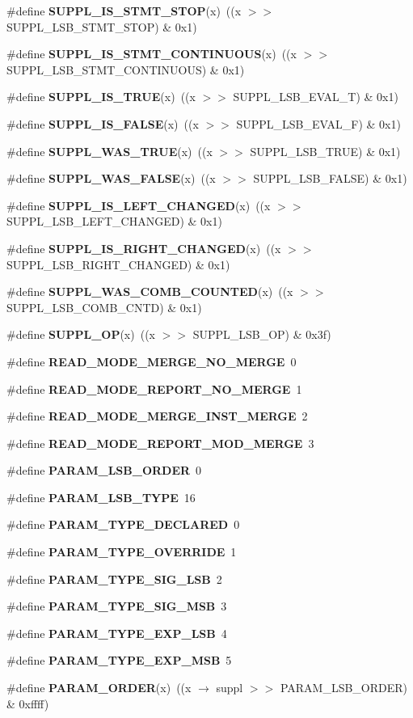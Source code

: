 \begin{CompactItemize}
\item 
\#define {\bf SUPPL\_\-IS\_\-STMT\_\-STOP}(x)\ ((x $>$$>$ SUPPL\_\-LSB\_\-STMT\_\-STOP) \& 0x1)
\item 
\#define {\bf SUPPL\_\-IS\_\-STMT\_\-CONTINUOUS}(x)\ ((x $>$$>$ SUPPL\_\-LSB\_\-STMT\_\-CONTINUOUS) \& 0x1)
\item 
\#define {\bf SUPPL\_\-IS\_\-TRUE}(x)\ ((x $>$$>$ SUPPL\_\-LSB\_\-EVAL\_\-T) \& 0x1)
\item 
\#define {\bf SUPPL\_\-IS\_\-FALSE}(x)\ ((x $>$$>$ SUPPL\_\-LSB\_\-EVAL\_\-F) \& 0x1)
\item 
\#define {\bf SUPPL\_\-WAS\_\-TRUE}(x)\ ((x $>$$>$ SUPPL\_\-LSB\_\-TRUE) \& 0x1)
\item 
\#define {\bf SUPPL\_\-WAS\_\-FALSE}(x)\ ((x $>$$>$ SUPPL\_\-LSB\_\-FALSE) \& 0x1)
\item 
\#define {\bf SUPPL\_\-IS\_\-LEFT\_\-CHANGED}(x)\ ((x $>$$>$ SUPPL\_\-LSB\_\-LEFT\_\-CHANGED) \& 0x1)
\item 
\#define {\bf SUPPL\_\-IS\_\-RIGHT\_\-CHANGED}(x)\ ((x $>$$>$ SUPPL\_\-LSB\_\-RIGHT\_\-CHANGED) \& 0x1)
\item 
\#define {\bf SUPPL\_\-WAS\_\-COMB\_\-COUNTED}(x)\ ((x $>$$>$ SUPPL\_\-LSB\_\-COMB\_\-CNTD) \& 0x1)
\item 
\#define {\bf SUPPL\_\-OP}(x)\ ((x $>$$>$ SUPPL\_\-LSB\_\-OP) \& 0x3f)
\item 
\#define {\bf READ\_\-MODE\_\-MERGE\_\-NO\_\-MERGE}\ 0
\item 
\#define {\bf READ\_\-MODE\_\-REPORT\_\-NO\_\-MERGE}\ 1
\item 
\#define {\bf READ\_\-MODE\_\-MERGE\_\-INST\_\-MERGE}\ 2
\item 
\#define {\bf READ\_\-MODE\_\-REPORT\_\-MOD\_\-MERGE}\ 3
\item 
\#define {\bf PARAM\_\-LSB\_\-ORDER}\ 0
\item 
\#define {\bf PARAM\_\-LSB\_\-TYPE}\ 16
\item 
\#define {\bf PARAM\_\-TYPE\_\-DECLARED}\ 0
\item 
\#define {\bf PARAM\_\-TYPE\_\-OVERRIDE}\ 1
\item 
\#define {\bf PARAM\_\-TYPE\_\-SIG\_\-LSB}\ 2
\item 
\#define {\bf PARAM\_\-TYPE\_\-SIG\_\-MSB}\ 3
\item 
\#define {\bf PARAM\_\-TYPE\_\-EXP\_\-LSB}\ 4
\item 
\#define {\bf PARAM\_\-TYPE\_\-EXP\_\-MSB}\ 5
\item 
\#define {\bf PARAM\_\-ORDER}(x)\ ((x $\rightarrow$ suppl $>$$>$ PARAM\_\-LSB\_\-ORDER) \& 0xffff)
$$
\end{CompactItemize}
